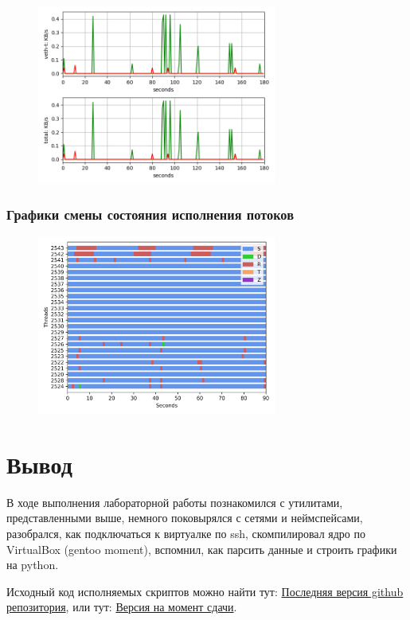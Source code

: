 \documentclass[11pt, a4paper]{article}
\begin{document}
\begin{figure}[h]
  \centering
  \includegraphics[width=0.7\textwidth]{fig-net.png}
\end{figure}

\subsubsection*{Графики смены состояния исполнения потоков}


\begin{figure}[h]
  \centering
  \includegraphics[width=0.7\textwidth]{fig-state-vert.png}
\end{figure}


\section{Вывод}
В ходе выполнения лабораторной работы познакомился с утилитами, представленными выше, немного
поковырялся с сетями и неймспейсами, разобрался, как подключаться к виртуалке по ssh, скомпилировал
ядро по VirtualBox (gentoo moment), вспомнил, как парсить данные и строить графики на python.

\medskip
\noindent Исходный код исполняемых скриптов можно найти тут: 
\href{https://github.com/zubrailx/University-ITMO/tree/main/Year-3/Operating-systems/lab-1}{Последняя версия github репозитория}, 
или тут: \href{https://github.com/zubrailx/University-ITMO/tree/d290a6562783b7df35565233c4b5c3bb988bc2cd/Year-3/Operating-systems/lab-1}{Версия на момент сдачи}.
\end{document}
